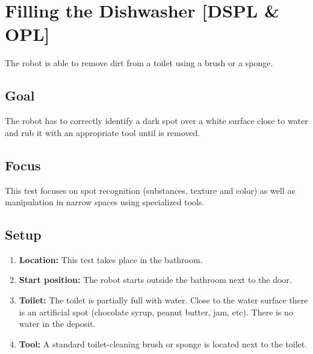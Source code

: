 \section{Filling the Dishwasher [DSPL \& OPL]}
The robot is able to remove dirt from a toilet using a brush or a sponge.

\subsection{Goal}
The robot has to correctly identify a dark spot over a white surface close to water and rub it with an appropriate tool until is removed.

\subsection{Focus}
This test focuses on spot recognition (substances, texture and color) as well as manipulation in narrow spaces using specialized tools.

\subsection{Setup}
\begin{enumerate}

	\item \textbf{Location:} This test takes place in the bathroom. 
	\item \textbf{Start position:} The robot starts outside the bathroom next to the door.
	\item \textbf{Toilet:} The toilet is partially full with water. Close to the water surface there is an artificial spot (chocolate syrup, peanut butter, jam, etc). There is no water in the deposit.
	\item \textbf{Tool:} A standard toilet-cleaning brush or sponge is located next to the toilet.
\end{enumerate}


